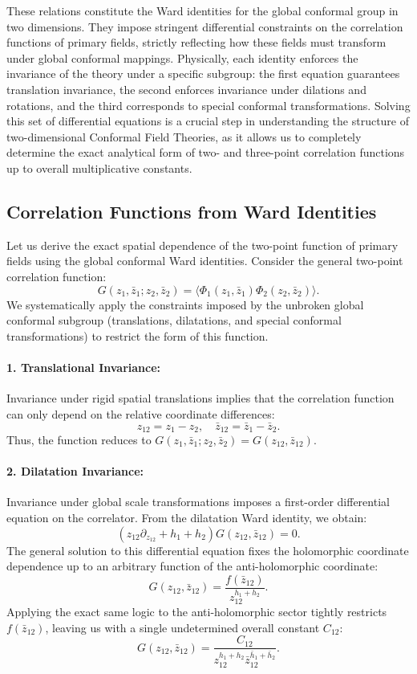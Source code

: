 These relations constitute the Ward identities for the global conformal group in two dimensions. They impose stringent differential constraints on the correlation functions of primary fields, strictly reflecting how these fields must transform under global conformal mappings. Physically, each identity enforces the invariance of the theory under a specific subgroup: the first equation guarantees translation invariance, the second enforces invariance under dilations and rotations, and the third corresponds to special conformal transformations. Solving this set of differential equations is a crucial step in understanding the structure of two-dimensional Conformal Field Theories, as it allows us to completely determine the exact analytical form of two- and three-point correlation functions up to overall multiplicative constants.

\subsection{Correlation Functions from Ward Identities}

Let us derive the exact spatial dependence of the two-point function of primary fields using the global conformal Ward identities. Consider the general two-point correlation function:
\[
    G(z_1, \bar{z}_1; z_2, \bar{z}_2) = \langle \Phi_1(z_1, \bar{z}_1) \Phi_2(z_2, \bar{z}_2) \rangle.
\]
We systematically apply the constraints imposed by the unbroken global conformal subgroup (translations, dilatations, and special conformal transformations) to restrict the form of this function.

\paragraph{1. Translational Invariance:}
Invariance under rigid spatial translations implies that the correlation function can only depend on the relative coordinate differences:
\[
    z_{12} = z_1 - z_2, \quad \bar{z}_{12} = \bar{z}_1 - \bar{z}_2.
\]
Thus, the function reduces to \( G(z_1, \bar{z}_1; z_2, \bar{z}_2) = G(z_{12}, \bar{z}_{12}) \).

\paragraph{2. Dilatation Invariance:}
Invariance under global scale transformations imposes a first-order differential equation on the correlator. From the dilatation Ward identity, we obtain:
\[
    (z_{12}\partial_{z_{12}} + h_1 + h_2)G(z_{12}, \bar{z}_{12}) = 0.
\]
The general solution to this differential equation fixes the holomorphic coordinate dependence up to an arbitrary function of the anti-holomorphic coordinate:
\[
    G(z_{12}, \bar{z}_{12}) = \frac{f(\bar{z}_{12})}{z_{12}^{h_1 + h_2}}.
\]
Applying the exact same logic to the anti-holomorphic sector tightly restricts \( f(\bar{z}_{12}) \), leaving us with a single undetermined overall constant \( C_{12} \):
\[
    G(z_{12}, \bar{z}_{12}) = \frac{C_{12}}{z_{12}^{h_1 + h_2} \bar{z}_{12}^{\bar{h}_1 + \bar{h}_2}}.
\]


